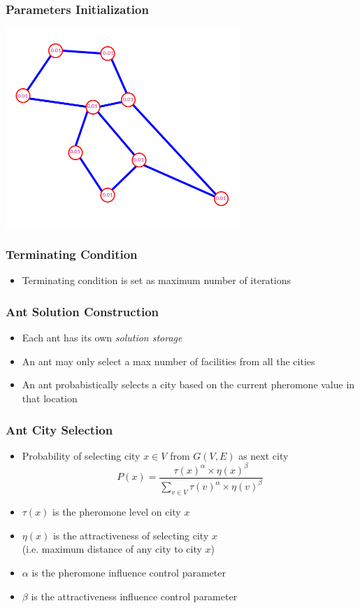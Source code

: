 \documentclass[12pt]{beamer}
\begin{document}
\begin{frame}
\frametitle{Parameters Initialization}
\begin{center}
\includegraphics[height=75mm]{Images/pheromone1}\\
\end{center}
\end{frame}


\begin{frame}
\frametitle{Terminating Condition}
\begin{itemize}
\item Terminating condition is set as maximum number of iterations
\end{itemize}
\end{frame}

\begin{frame}
\frametitle{Ant Solution Construction}
\begin{itemize}
\item Each ant has its own \textit{solution storage}
\item An ant may only select a max number of facilities from all the cities
\item An ant \alert{probabistically} selects a city based on the current pheromone value in that location
\end{itemize}
\end{frame}

\begin{frame}
\frametitle{Ant City Selection}
\begin{itemize}
\item Probability of selecting city $x \in V$ from $G(V,E)$ as next city
$$
P(x) = \frac{\tau(x)^{\alpha} \times \eta(x)^{\beta}}{\sum_{v \in V} \tau(v)^{\alpha} \times \eta(v)^{\beta}}
$$
\item $\tau(x)$ is the pheromone level on city $x$
\item $\eta(x)$ is the attractiveness of selecting city $x$ \\(i.e. maximum distance of any city to city $x$)
\item $\alpha$ is the pheromone influence control parameter
\item $\beta$ is the attractiveness influence control parameter
\end{itemize}
\end{frame}
\end{document}
